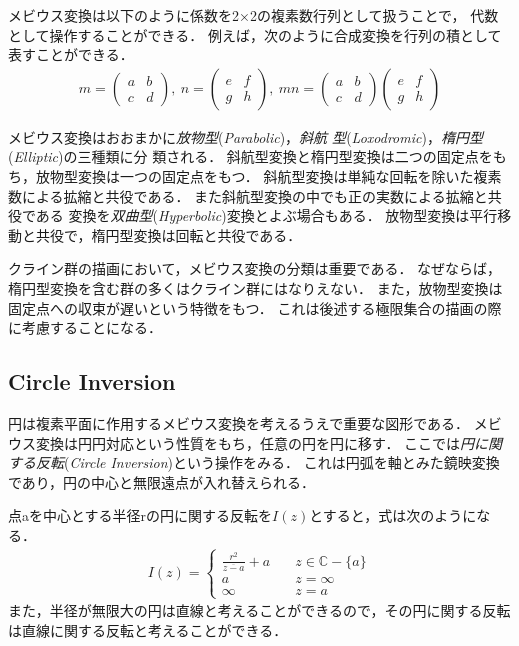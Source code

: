 メビウス変換は以下のように係数を2×2の複素数行列として扱うことで，
代数として操作することができる．
例えば，次のように合成変換を行列の積として表すことができる．
\begin{align*}
  m = \left(
 \begin{array}{ccc}
  a & b \\
  c & d
 \end{array}
 \right),~
 n = \left(
 \begin{array}{ccc}
  e & f \\
  g & h
 \end{array}
 \right),~
 mn = \left(
 \begin{array}{ccc}
  a & b \\
  c & d
 \end{array}
 \right)
\left(
 \begin{array}{ccc}
  e & f \\
  g & h
 \end{array}
 \right)
\end{align*}

メビウス変換はおおまかに\emph{放物型}(\textit{Parabolic})，\emph{斜航
型}(\textit{Loxodromic})，\emph{楕円型}(\textit{Elliptic})の三種類に分
類される．
斜航型変換と楕円型変換は二つの固定点をもち，放物型変換は一つの固定点をもつ．
斜航型変換は単純な回転を除いた複素数による拡縮と共役である．
また斜航型変換の中でも正の実数による拡縮と共役である
変換を\emph{双曲型}(\textit{Hyperbolic})変換とよぶ場合もある．
放物型変換は平行移動と共役で，楕円型変換は回転と共役である．

クライン群の描画において，メビウス変換の分類は重要である．
なぜならば，楕円型変換を含む群の多くはクライン群にはなりえない．
また，放物型変換は固定点への収束が遅いという特徴をもつ．
これは後述する極限集合の描画の際に考慮することになる．

\subsection{Circle Inversion}

円は複素平面に作用するメビウス変換を考えるうえで重要な図形である．
メビウス変換は円円対応という性質をもち，任意の円を円に移す．
ここでは\emph{円に関する反転}(\textit{Circle Inversion})という操作をみる．
これは円弧を軸とみた鏡映変換であり，円の中心と無限遠点が入れ替えられる．

点aを中心とする半径rの円に関する反転を$I(z)$とすると，式は次のようになる．
\begin{align*}
I(z) =
 \begin{cases}
  \frac{r^2}{\overline{z - a}} + a \quad & z \in \mathbb{C} - \{a\} \\
  a \quad & z = \infty\\
  \infty \quad & z = a
 \end{cases}
\end{align*}
また，半径が無限大の円は直線と考えることができるので，その円に関する反転
は直線に関する反転と考えることができる．


